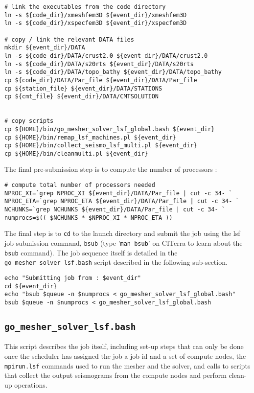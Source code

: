 \documentclass[onecolumn]{article}
\begin{document}
{\small
\begin{verbatim}
# link the executables from the code directory
ln -s ${code_dir}/xmeshfem3D ${event_dir}/xmeshfem3D
ln -s ${code_dir}/xspecfem3D ${event_dir}/xspecfem3D

# copy / link the relevant DATA files
mkdir ${event_dir}/DATA
ln -s ${code_dir}/DATA/crust2.0 ${event_dir}/DATA/crust2.0
ln -s ${code_dir}/DATA/s20rts ${event_dir}/DATA/s20rts
ln -s ${code_dir}/DATA/topo_bathy ${event_dir}/DATA/topo_bathy
cp ${code_dir}/DATA/Par_file ${event_dir}/DATA/Par_file
cp ${station_file} ${event_dir}/DATA/STATIONS
cp ${cmt_file} ${event_dir}/DATA/CMTSOLUTION


# copy scripts
cp ${HOME}/bin/go_mesher_solver_lsf_global.bash ${event_dir}
cp ${HOME}/bin/remap_lsf_machines.pl ${event_dir}
cp ${HOME}/bin/collect_seismo_lsf_multi.pl ${event_dir}
cp ${HOME}/bin/cleanmulti.pl ${event_dir}
\end{verbatim}}

The final pre-submission step is to compute the number of processors :

{\small
\begin{verbatim}
# compute total number of processors needed
NPROC_XI=`grep NPROC_XI ${event_dir}/DATA/Par_file | cut -c 34- `
NPROC_ETA=`grep NPROC_ETA ${event_dir}/DATA/Par_file | cut -c 34- `
NCHUNKS=`grep NCHUNKS ${event_dir}/DATA/Par_file | cut -c 34- `
numprocs=$(( $NCHUNKS * $NPROC_XI * NPROC_ETA ))
\end{verbatim}
}

The final step is to \texttt{cd} to the launch directory and submit
the job using the lsf job submission command, \texttt{bsub}
(type '\texttt{man bsub}' on CITerra to learn about the \texttt{bsub} command).
The job sequence itself is detailed in the \texttt{go\_mesher\_solver\_lsf.bash}
script described in the following sub-section.

{\small
\begin{verbatim}
echo "Submitting job from : $event_dir"
cd ${event_dir}
echo "bsub $queue -n $numprocs < go_mesher_solver_lsf_global.bash"
bsub $queue -n $numprocs < go_mesher_solver_lsf_global.bash

\end{verbatim}}

\subsection{\texttt{go\_mesher\_solver\_lsf.bash}}

This script describes the job itself, including set-up steps that can only
be done once the scheduler has assigned the job a job id and a set of
compute nodes, the \texttt{mpirun.lsf} commands used to run the mesher and
the solver, and calls to scripts that collect the output seismograms from
the compute nodes and perform clean-up operations.
\end{document}
